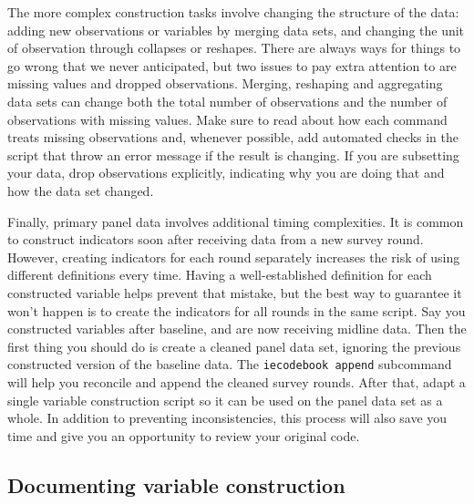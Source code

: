 The more complex construction tasks involve changing the structure of the data:
adding new observations or variables by merging data sets,
and changing the unit of observation through collapses or reshapes.
There are always ways for things to go wrong that we never anticipated,
but two issues to pay extra attention to are missing values and dropped observations.
Merging, reshaping and aggregating data sets can change both the total number of observations
and the number of observations with missing values.
Make sure to read about how each command treats missing observations and,
whenever possible, add automated checks in the script that throw an error message if the result is changing.
If you are subsetting your data,
drop observations explicitly,
indicating why you are doing that and how the data set changed.

Finally, primary panel data involves additional timing complexities.
It is common to construct indicators soon after receiving data from a new survey round.
However, creating indicators for each round separately increases the risk of using different definitions every time.
Having a well-established definition for each constructed variable helps prevent that mistake,
but the best way to guarantee it won't happen is to create the indicators for all rounds in the same script.
Say you constructed variables after baseline, and are now receiving midline data.
Then the first thing you should do is create a cleaned panel data set,
ignoring the previous constructed version of the baseline data.
The \texttt{iecodebook append} subcommand will help you reconcile and append the cleaned survey rounds.
After that, adapt a single variable construction script so it can be used on the panel data set as a whole.
In addition to preventing inconsistencies,
this process will also save you time and give you an opportunity to review your original code.

\subsection{Documenting variable construction}

